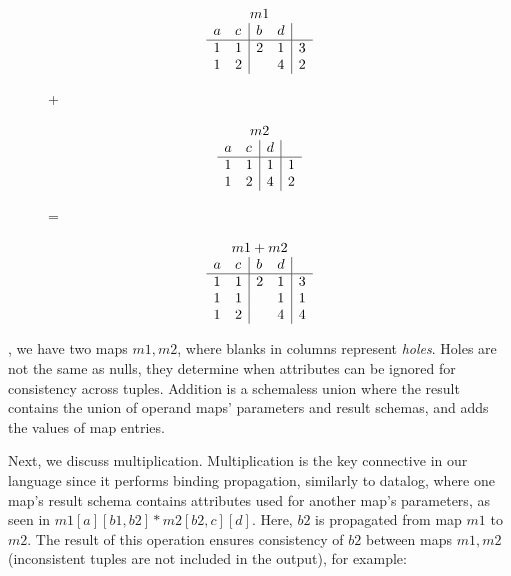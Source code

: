 {\begin{figure}[h]
\begin{minipage}{1in}
\[
\begin{array}{ll|ll|l}
\multicolumn{5}{c}{m1}\\
 a & c & b & d & \\
\hline
 1 & 1 & 2 & 1 & 3 \\
\comment{
 1 & 2 & 4 & 2 & 1 \\
 1 & 2 & 3 & 3 & 4 \\
}
 1 & 2 &   & 4 & 2
\end{array}
\]
\end{minipage}
+
\begin{minipage}{0.85in}
\[
\begin{array}{ll|l|l}
\multicolumn{4}{c}{m2}\\
 a & c & d & \\
\hline
 1 & 1 & 1 & 1 \\
 1 & 2 & 4 & 2 \\
\end{array}
\]
\end{minipage}
=
\begin{minipage}{1in}
\[
\begin{array}{ll|ll|l}
\multicolumn{5}{c}{m1 + m2}\\
 a & c & b & d & \\
\hline
 1 & 1 & 2 & 1 & 3 \\
 1 & 1 &   & 1 & 1 \\
\comment{
 1 & 2 & 4 & 2 & 1 \\
 1 & 2 & 3 & 3 & 4 \\
}
 1 & 2 &   & 4 & 4
\end{array}
\]
\end{minipage}
\end{figure}

\noindent {}, we have two maps $m1, m2$, where blanks in columns
represent \textit{holes}. Holes are not the same as nulls, they determine when attributes
can be ignored for consistency across tuples.
Addition is a schemaless union where the result contains the union of
operand maps' parameters and result schemas, and adds the values of map entries.

Next, we discuss multiplication. Multiplication is the key
connective in our language since it performs binding propagation, similarly to
datalog, where one map's result schema contains attributes used for
another map's parameters, as seen in $m1[a][b1,b2] * m2[b2,c][d]$.
Here, $b2$ is propagated from map $m1$ to $m2$. The result of this
operation ensures consistency of $b2$ between maps $m1, m2$ (inconsistent
tuples are not included in the output), for example:

}

